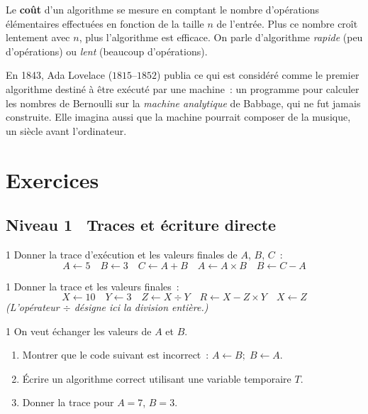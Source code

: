 \begin{remarque}
Le \textbf{co\^ut} d'un algorithme se mesure en comptant le nombre
d'op\'erations \'el\'ementaires effectu\'ees en fonction de la taille $n$
de l'entr\'ee. Plus ce nombre cro\^it lentement avec $n$, plus l'algorithme
est efficace. On parle d'algorithme \emph{rapide} (peu d'op\'erations) ou
\emph{lent} (beaucoup d'op\'erations).
\end{remarque}

\begin{anecdote}
En 1843, Ada Lovelace ($1815$--$1852$) publia ce qui est consid\'er\'e
comme le premier algorithme destin\'e \`a \^etre ex\'ecut\'e par une machine~:
un programme pour calculer les nombres de Bernoulli sur la
\emph{machine analytique} de Babbage, qui ne fut jamais construite.
Elle imagina aussi que la machine pourrait composer de la musique,
un si\`ecle avant l'ordinateur.
\end{anecdote}

\section{Exercices}

\subsection*{\quad Niveau 1 \textemdash\ Traces et \'ecriture directe}

\begin{exo}{1}
Donner la trace d'ex\'ecution et les valeurs finales de $A$, $B$, $C$~:
\[
A \leftarrow 5 \quad B \leftarrow 3 \quad C \leftarrow A + B \quad
A \leftarrow A \times B \quad B \leftarrow C - A
\]
\end{exo}

\begin{exo}{1}
Donner la trace et les valeurs finales~:
\[
X \leftarrow 10 \quad Y \leftarrow 3 \quad
Z \leftarrow X \div Y \quad R \leftarrow X - Z \times Y \quad
X \leftarrow Z
\]
\emph{(L'op\'erateur $\div$ d\'esigne ici la division enti\`ere.)}
\end{exo}

\begin{exo}{1}
On veut \'echanger les valeurs de $A$ et $B$.
\begin{enumerate}
  \item Montrer que le code suivant est incorrect~:
        $A \leftarrow B ;\; B \leftarrow A$.
  \item \'Ecrire un algorithme correct utilisant une variable temporaire $T$.
  \item Donner la trace pour $A=7$, $B=3$.
\end{enumerate}
\end{exo}


